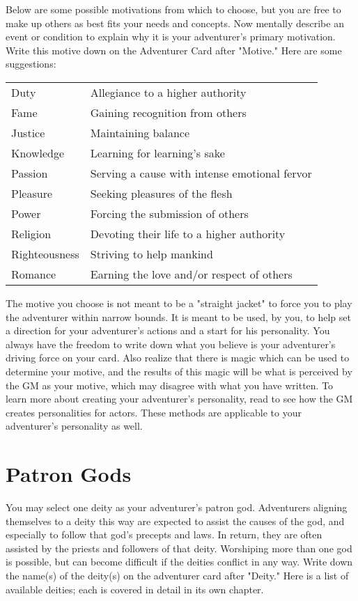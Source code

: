 Below are some possible motivations from which to choose, but you are free to make up others as best fits your needs and concepts. Now mentally describe an event or condition to explain why it is your adventurer's primary motivation. Write this motive down on the Adventurer Card after "Motive." Here are some suggestions:

\begin{normboxc}[Motivation]
\small
\begin{tabularx}{\linewidth}{@{} l L}
Duty & Allegiance to a higher authority\\
Fame & Gaining recognition from others\\
Justice & Maintaining balance\\
Knowledge & Learning for learning's sake\\
Passion & Serving a cause with intense emotional fervor\\
Pleasure & Seeking pleasures of the flesh\\
Power & Forcing the submission of others\\
Religion & Devoting their life to a higher authority\\
Righteousness & Striving to help mankind\\
Romance & Earning the love and/or respect of others
\end{tabularx}
\end{normboxc}

The motive you choose is not meant to be a "straight jacket" to force you to play the adventurer within narrow bounds. It is meant to be used, by you, to help set a direction for your adventurer's actions and a start for his personality. You always have the freedom to write down what you believe is your adventurer's driving force on your card. Also realize that there is magic which can be used to determine your motive, and the results of this magic will be what is perceived by the GM as your motive, which may disagree with what you have written.
To learn more about creating your adventurer's personality, read  to see how the GM creates personalities for actors. These methods are applicable to your adventurer's personality as well.
\section{Patron Gods}

You may select one deity as your adventurer's patron god. Adventurers aligning themselves to a deity this way are expected to assist the causes of the god, and especially to follow that god's precepts and laws. In return, they are often assisted by the priests and followers of that deity. Worshiping more than one god is possible, but can become difficult if the deities conflict in any way. Write down the name(s) of the deity(s) on the adventurer card after "Deity." Here is a list of available deities; each is covered in detail in its own chapter.

